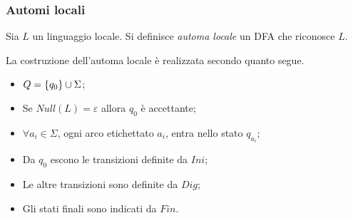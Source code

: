 \documentclass{subfiles}
\begin{document}
\subsubsection{Automi locali}
\begin{Definition*}
    Sia \(L\) un linguaggio locale. Si definisce \emph{automa locale} un DFA che riconosce \(L\).

    \noindent La costruzione dell'automa locale è realizzata secondo quanto segue.
    \begin{itemize}
        \item \(Q = \left\{q_{0}\right\} \cup \Sigma\);
        \item Se \(Null(L) = \varepsilon\) allora \(q_{0}\) è accettante;
        \item \(\forall a_{i} \in \Sigma\), ogni arco etichettato \(a_{i}\), entra nello stato \(q_{a_{i}}\);
        \item Da \(q_{0}\) escono le transizioni definite da \(Ini\);
        \item Le altre transizioni sono definite da \(Dig\);
        \item Gli stati finali sono indicati da \(Fin\).
    \end{itemize}
\end{Definition*}
\end{document}
